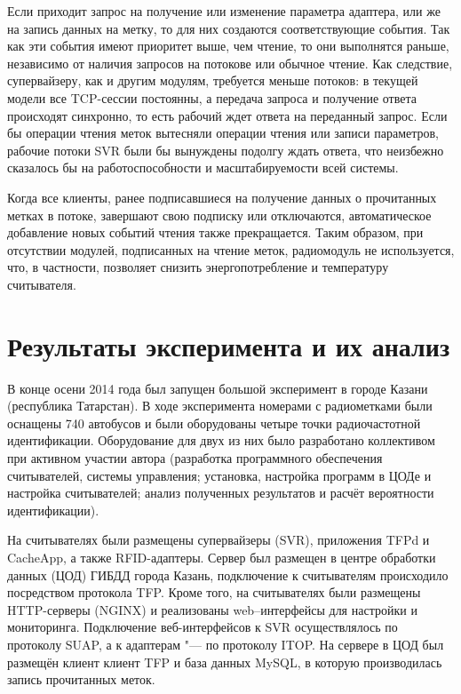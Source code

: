 Если приходит запрос на получение или изменение параметра адаптера, или же на запись данных на метку, то для них создаются соответствующие события. Так как эти события имеют приоритет выше, чем чтение, то они выполнятся раньше, независимо от наличия запросов на потокове или обычное чтение. Как следствие, супервайзеру, как и другим модулям, требуется меньше потоков: в текущей модели все TCP-сессии постоянны, а передача запроса и получение ответа происходят синхронно, то есть рабочий ждет ответа на переданный запрос. Если бы операции чтения меток вытесняли операции чтения или записи параметров, рабочие потоки SVR были бы вынуждены подолгу ждать ответа, что неизбежно сказалось бы на работоспособности и масштабируемости всей системы.

Когда все клиенты, ранее подписавшиеся на получение данных о прочитанных метках в потоке, завершают свою подписку или отключаются, автоматическое добавление новых событий чтения также прекращается. Таким образом, при отсутствии модулей, подписанных на чтение меток, радиомодуль не используется, что, в частности, позволяет снизить энергопотребление и температуру считывателя.



\section{Результаты эксперимента и их анализ}\label{sec:ch5_results}

В конце осени 2014 года был запущен большой эксперимент в городе Казани (республика Татарстан). В ходе эксперимента номерами с радиометками были оснащены 740 автобусов и были оборудованы четыре точки радиочастотной идентификации. Оборудование для двух из них было разработано коллективом при активном участии автора (разработка программного обеспечения считывателей, системы управления; установка, настройка программ в ЦОДе и настройка считывателей; анализ полученных результатов и расчёт вероятности идентификации).


На считывателях были размещены супервайзеры (SVR), приложения TFPd и CacheApp, а также RFID-адаптеры. Сервер был размещен в центре обработки данных (ЦОД) ГИБДД города Казань, подключение к считывателям происходило посредством протокола TFP. Кроме того, на считывателях были размещены HTTP-серверы (NGINX) и реализованы web--интерфейсы для настройки и мониторинга. Подключение веб-интерфейсов к SVR осуществлялось по протоколу SUAP, а к адаптерам "--- по протоколу ITOP. На сервере в ЦОД был размещён клиент клиент TFP и база данных MySQL, в которую производилась запись прочитанных меток. 

